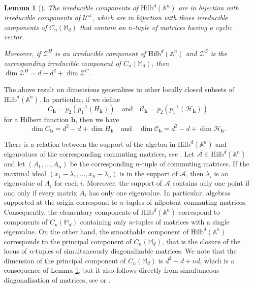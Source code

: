 \documentclass[11pt]{amsart}
\newtheorem{lemma}[thm]{Lemma}
\theoremstyle{definition}
\newcommand{\A}{\mathbb{A}}
\newcommand{\Hilb}[2]{\mathrm{Hilb}^{#1}(\A^{#2})}
\newcommand{\h}{\mathbf{h}}
\newcommand{\cH}{\mathscr{H}}
\newcommand{\cC}{\mathscr{C}}
\newcommand{\ComMat}[2]{C_{#1}(\mathbb{M}_{#2})}
\newcommand{\cA}{\mathcal{A}}
\begin{document}
\begin{lemma}[{\cite[\S 3.4]{JS}}]\label{lemma: bijection components of HS and commuting matrices}
The irreducible components of $\Hilb{d}{n}$ are in bijection with irreducible components of $\mathcal{U}^{st}$, which are in bijection with those irreducible components of $\ComMat{n}{d}$ that contain an $n$-tuple of matrices having a cyclic vector.

Moreover, if $\mathcal{Z}^H$ is an irreducible component of $\Hilb{d}{n}$ and $\mathcal{Z}^C$ is the corresponding irreducible component of $\ComMat{n}{d}$, then $\dim \mathcal{Z}^H=d-d^2+\dim \mathcal{Z}^C$.
\end{lemma}

The above result on dimensions generalizes to other locally closed subsets of $\Hilb{d}{n}$. In particular, if we define
$$C_\h=p_2(p_1^{-1}(H_\h))\quad \mathrm{and}\quad \cC_\h=p_2(p_1^{-1}(\cH_\h))$$
for a Hilbert function $\h$, then we have
\begin{equation}\label{eq: dim Hilbert - matrices}
\dim C_\h=d^2-d+\dim H_\h\quad \mathrm{and}\quad \dim \cC_\h=d^2-d+\dim \cH_\h.
\end{equation}

There is a relation between the support of the algebra in $\Hilb{d}{n}$ and eigenvalues of the corresponding commuting matrices, see \cite[\S 3.3 - 3.4]{JS}. Let $\cA\in \Hilb{d}{n}$ and let $(A_1,\ldots ,A_n)$ be the corresponding $n$-tuple of commuting matrices. If the maximal ideal $(x_1-\lambda_1,\ldots ,x_n-\lambda_n)$ is in the support of $\cA$, then $\lambda_i$ is an eigenvalue of $A_i$ for each $i$. Moreover, the support of $\cA$ contains only one point if and only if every matrix $A_i$ has only one eigenvalue. In particular, algebras supported at the origin correspond to $n$-tuples of nilpotent commuting matrices. Consequently, the elementary components of $\Hilb{d}{n}$ correspond to components of $\ComMat{n}{d}$ containing only $n$-tuples of matrices with a single eigenvalue. On the other hand, the smoothable component of $\Hilb{d}{n}$ corresponds to the principal component of $\ComMat{n}{d}$, that is the closure of the locus of $n$-tuples of simultaneously diagonalizable matrices. We note that the dimension of the principal component of $\ComMat{n}{d}$ is $d^2-d+nd$, which is a consequence of Lemma \ref{lemma: bijection components of HS and commuting matrices}, but it also follows directly from simultaneous diagonalization of matrices, see \cite[Proposition 6]{GS} or \cite[\S 3.4]{JS}.
\end{document}
